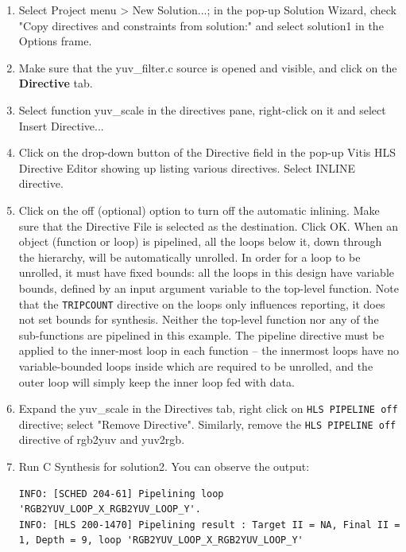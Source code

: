 \documentclass[a4paper,12pt,twoside]{article}
\begin{document}
\begin{enumerate}
    \item Select Project menu > New Solution...; in the pop-up Solution Wizard, check "Copy directives and constraints from solution:" and select solution1 in the Options frame.
    \item Make sure that the yuv\_filter.c source is opened and visible, and click on the \textbf{Directive} tab.
    \item Select function yuv\_scale in the directives pane, right-click on it and select Insert Directive...
    \item Click on the drop-down button of the Directive field in the pop-up Vitis HLS Directive Editor showing up listing various directives. Select INLINE directive.
    \item Click on the off (optional) option to turn off the automatic inlining. Make sure that the Directive File is selected as the destination. Click OK. When an object (function or loop) is pipelined, all the loops below it, down through the hierarchy, will be automatically unrolled. In order for a loop to be unrolled, it must have fixed bounds: all the loops in this design have variable bounds, defined by an input argument variable to the top-level function. Note that the \texttt{TRIPCOUNT} directive on the loops only influences reporting, it does not set bounds for synthesis. Neither the top-level function nor any of the sub-functions are pipelined in this example. The pipeline directive must be applied to the inner-most loop in each function – the innermost loops have no variable-bounded loops inside which are required to be unrolled, and the outer loop will simply keep the inner loop fed with data.
    \item Expand the yuv\_scale in the Directives tab, right click on \texttt{HLS PIPELINE off} directive; select "Remove Directive". Similarly, remove the \texttt{HLS PIPELINE off} directive of rgb2yuv and yuv2rgb. %
    \item Run C Synthesis for solution2. You can observe the output:
    \begin{verbatim}
INFO: [SCHED 204-61] Pipelining loop 'RGB2YUV_LOOP_X_RGB2YUV_LOOP_Y'.
INFO: [HLS 200-1470] Pipelining result : Target II = NA, Final II = 1, Depth = 9, loop 'RGB2YUV_LOOP_X_RGB2YUV_LOOP_Y'

\end{verbatim}
\end{enumerate}
\end{document}
